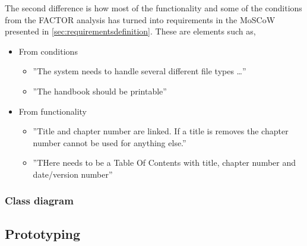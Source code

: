 The second difference is how most of the functionality and some of the conditions from the FACTOR analysis has turned into requirements in the MoSCoW presented in \cref{sec:requirementsdefinition}. These are elements such as,
\begin{itemize}
	\item From conditions
	\begin{itemize}
		\item 
		''The system needs to handle several different file types \ldots''
		\item 
		''The handbook should be printable''
	\end{itemize}
	\item From functionality
	\begin{itemize}
		\item 
		''Title and chapter number are linked. If a title is removes the chapter number cannot be used for anything else.''
		\item 
		''THere needs to be a Table Of Contents with title, chapter number and date/version number''
	\end{itemize}
\end{itemize}

\subsubsection*{Class diagram}

\subsection{Prototyping}
